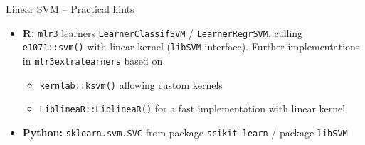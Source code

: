 \begin{frame}{Linear SVM -- Practical hints}
\begin{itemize}
  \item \textbf{R:} \texttt{mlr3} learners \texttt{LearnerClassifSVM} /
  \texttt{LearnerRegrSVM}, calling \texttt{e1071::svm()} with linear kernel (\texttt{libSVM} interface).
  Further implementations in \texttt{mlr3extralearners} based on
  \begin{itemize}
      \item \texttt{kernlab::ksvm()} allowing custom kernels
      \item \texttt{LiblineaR::LiblineaR()} for a fast implementation with linear kernel
  \end{itemize}
  \item \textbf{Python:} \texttt{sklearn.svm.SVC} from package 
  \texttt{scikit-learn} / package \texttt{libSVM}
\end{itemize}

\end{frame}


